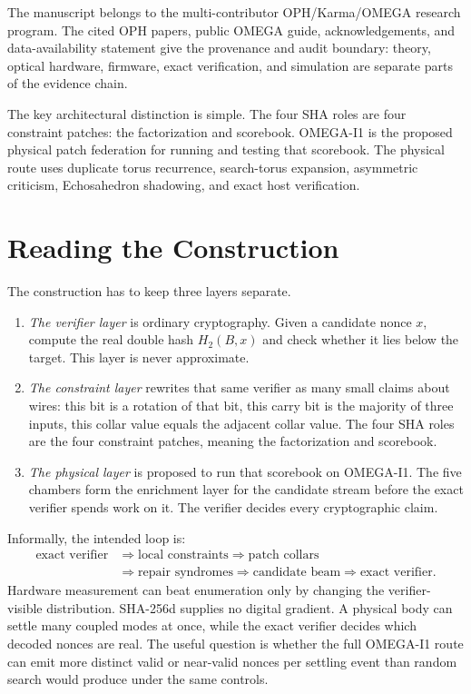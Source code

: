 \documentclass[11pt]{article}
\theoremstyle{definition}
\theoremstyle{remark}
\begin{document}
The manuscript belongs to the multi-contributor OPH/Karma/OMEGA research
program. The cited OPH papers, public OMEGA guide, acknowledgements, and
data-availability statement give the provenance and audit boundary: theory,
optical hardware, firmware, exact verification, and simulation are separate
parts of the evidence chain.

The key architectural distinction is simple. The four SHA roles are four
constraint patches: the factorization and scorebook. OMEGA-I1 is the proposed
physical patch federation for running and testing that scorebook. The physical
route uses duplicate torus recurrence, search-torus expansion, asymmetric
criticism, Echosahedron shadowing, and exact host verification.

\section{Reading the Construction}

The construction has to keep three layers separate.

\begin{enumerate}
\item \emph{The verifier layer} is ordinary cryptography. Given a candidate
nonce \(x\), compute the real double hash \(H_2(B,x)\) and check whether it lies
below the target. This layer is never approximate.
\item \emph{The constraint layer} rewrites that same verifier as many small
claims about wires: this bit is a rotation of that bit, this carry bit is the
majority of three inputs, this collar value equals the adjacent collar value.
The four SHA roles are the four constraint patches, meaning the factorization
and scorebook.
\item \emph{The physical layer} is proposed to run that scorebook on OMEGA-I1. The five
chambers form the enrichment layer for the candidate stream before the exact
verifier spends work on it. The verifier decides every cryptographic claim.
\end{enumerate}

Informally, the intended loop is:
\[
\begin{aligned}
\text{exact verifier}
&\Rightarrow
\text{local constraints}
\Rightarrow
\text{patch collars}\\
&\Rightarrow
\text{repair syndromes}
\Rightarrow
\text{candidate beam}
\Rightarrow
\text{exact verifier}.
\end{aligned}
\]
Hardware measurement can beat enumeration only by changing the
verifier-visible distribution. SHA-256d supplies no digital gradient. A physical
body can settle many coupled modes at once, while the exact verifier decides
which decoded nonces are real. The useful question is whether the full OMEGA-I1
route can emit more distinct valid or near-valid nonces per settling event than
random search would produce under the same controls.
\end{document}
